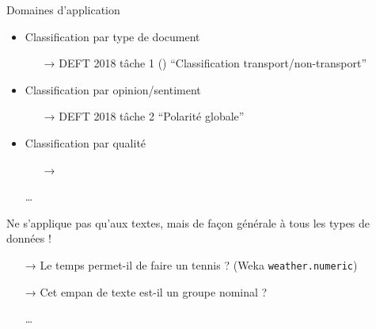 \documentclass[../allslides.tex]{subfiles}
\begin{document}
\begin{frame}{Domaines d'application}
	\begin{itemize}
		\item Classification par type de document
			\begin{itemize}
				\item[→] DEFT 2018 tâche 1 () \enquote{Classification transport/non-transport}
			\end{itemize}
		\item Classification par opinion/sentiment
			\begin{itemize}
				\item[→] DEFT 2018 tâche 2 \enquote{Polarité globale}
			\end{itemize}
		\item Classification par qualité
			\begin{itemize}
				\item[→] 
			\end{itemize}
		\item[…]
	\end{itemize}
	Ne s'applique pas qu'aux textes, mais de façon générale à tous les types de données !
	\begin{itemize}
		\item[→] Le temps permet-il de faire un tennis ? (Weka \texttt{weather.numeric})
		\item[→] Cet empan de texte est-il un groupe nominal ?
		\item[…]
	\end{itemize}
\end{frame}
\end{document}
